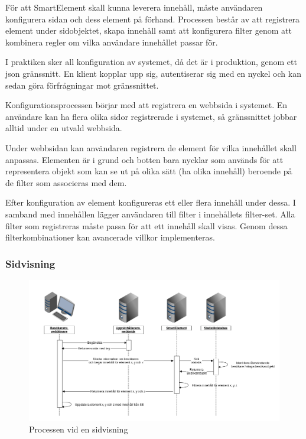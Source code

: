 För att SmartElement skall kunna leverera innehåll, måste användaren konfigurera sidan och dess element på förhand. Processen består av att registrera element under sidobjektet, skapa innehåll samt att konfigurera filter genom att kombinera regler om vilka användare innehållet passar för.

I praktiken sker all konfiguration av systemet, då det är i produktion, genom ett \gls{json} gränssnitt. En klient kopplar upp sig, autentiserar sig med en nyckel och kan sedan göra förfrågningar mot gränssnittet.

Konfigurationsprocessen börjar med att registrera en webbsida i systemet. En användare kan ha flera olika sidor registrerade i systemet, så gränssnittet jobbar alltid under en utvald webbsida.

Under webbsidan kan användaren registrera de element för vilka innehållet skall anpassas. Elementen är i grund och botten bara nycklar som används för att representera objekt som kan se ut på olika sätt (ha olika innehåll) beroende på de filter som associeras med dem.

Efter konfiguration av element konfigureras ett eller flera innehåll under dessa. I samband med innehållen lägger användaren till filter i innehållets filter-set. Alla filter som registreras måste passa för att ett innehåll skall visas. Genom dessa filterkombinationer kan avancerade villkor implementeras.

\subsubsection{Sidvisning}

\begin{figure}[h!]
\centering
\includegraphics[width=150mm]{assets/images/smelementactivity.png}
\caption{Processen vid en sidvisning}
\label{pageviewprocess}
\end{figure}


